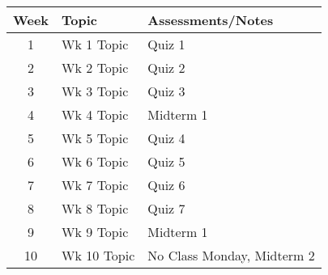 \documentclass{article}
\begin{document}
\begin{table}[ht]
\begin{tabular}{|c|l|l|}
\hline
\textbf{Week} & \textbf{Topic}     & \textbf{Assessments/Notes}               \\ \hline
1              & Wk 1 Topic            & Quiz 1                                                                     \\ \hline
2             & Wk 2 Topic            & Quiz 2                                                                     \\ \hline
3             & Wk 3 Topic            & Quiz 3                                                                     \\ \hline
4             & Wk 4 Topic            & Midterm 1                                                                  \\ \hline
5             & Wk 5 Topic            & Quiz 4                                                                     \\ \hline
6             & Wk 6 Topic            & Quiz 5                                                                     \\ \hline
7             & Wk 7 Topic            & Quiz 6                                                                     \\ \hline
8             & Wk 8 Topic            & Quiz 7                                                 \\ \hline
9             & Wk 9 Topic            & Midterm 1                                           \\ \hline
10           & Wk 10 Topic           & No Class Monday, Midterm 2           \\ \hline
\end{tabular}
\end{table}
\end{document}
